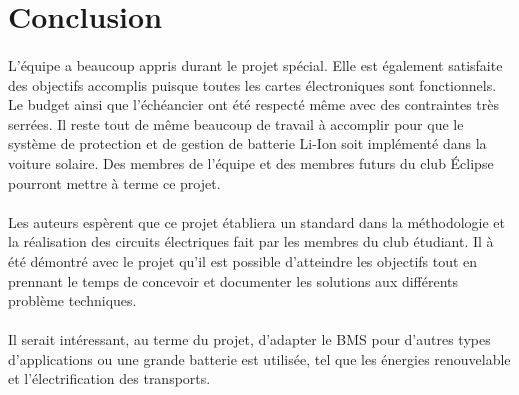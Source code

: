 \section{Conclusion}

	\paragraph{}
	L'équipe a beaucoup appris durant le projet spécial. Elle est également satisfaite des objectifs accomplis puisque toutes les cartes électroniques sont fonctionnels. Le budget ainsi que l'échéancier ont été respecté même avec des contraintes très serrées. Il reste tout de même beaucoup de travail à accomplir pour que le système de protection et de gestion de batterie Li-Ion soit implémenté dans la voiture solaire. Des membres de l'équipe et des membres futurs du club Éclipse pourront mettre à terme ce projet.
	
	\paragraph{}
	 Les auteurs espèrent que ce projet établiera un standard dans la méthodologie et la réalisation des circuits électriques fait par les membres du club étudiant. Il à été démontré avec le projet qu'il est possible d'atteindre les objectifs tout en prennant le temps de concevoir et documenter les solutions aux différents problème techniques. 

	\paragraph{}	
	Il serait intéressant, au terme du projet, d'adapter le BMS pour d'autres types d'applications ou une grande batterie est utilisée, tel que les énergies renouvelable et l'électrification des transports. 